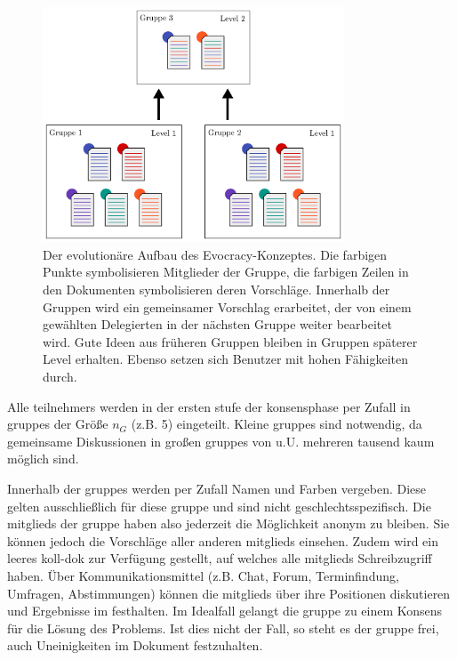 \documentclass[10pt]{article}
\begin{document}
\begin{figure}[!t]
	\centering
	\includegraphics[width=0.8\textwidth]{evolution-tree_v2.pdf}
	\caption{Der evolutionäre Aufbau des Evocracy-Konzeptes. Die farbigen Punkte symbolisieren Mitglieder der Gruppe, die farbigen Zeilen in den Dokumenten symbolisieren deren Vorschläge. Innerhalb der Gruppen wird ein gemeinsamer Vorschlag erarbeitet, der von einem gewählten Delegierten in der nächsten Gruppe weiter bearbeitet wird. Gute Ideen aus früheren Gruppen bleiben in Gruppen späterer Level erhalten. Ebenso setzen sich Benutzer mit hohen Fähigkeiten durch.}
	\label{fig.evolution_tree}
\end{figure}

Alle \glspl{teilnehmer} werden in der ersten \gls{stufe} der \gls{konsensphase} per Zufall in \glspl{gruppe} der Größe $n_G$ (z.B. 5) eingeteilt. Kleine \glspl{gruppe} sind notwendig, da gemeinsame Diskussionen in großen \glspl{gruppe} von u.U. mehreren tausend  kaum möglich sind.

Innerhalb der \glspl{gruppe} werden per Zufall Namen und Farben vergeben. Diese gelten ausschließlich für diese \gls{gruppe} und sind nicht geschlechtsspezifisch. Die \glspl{mitglied} der \gls{gruppe} haben also jederzeit die Möglichkeit anonym zu bleiben. Sie können jedoch die Vorschläge aller anderen \glspl{mitglied} einsehen. Zudem wird ein leeres \gls{koll-dok} zur Verfügung gestellt, auf welches alle \glspl{mitglied} Schreibzugriff haben. Über Kommunikationsmittel (z.B. Chat, Forum, Terminfindung, Umfragen, Abstimmungen) können die \glspl{mitglied} über ihre Positionen diskutieren und Ergebnisse im  festhalten. Im Idealfall gelangt die \gls{gruppe} zu einem Konsens für die Lösung des Problems. Ist dies nicht der Fall, so steht es der \gls{gruppe} frei, auch Uneinigkeiten im Dokument festzuhalten.
\end{document}
